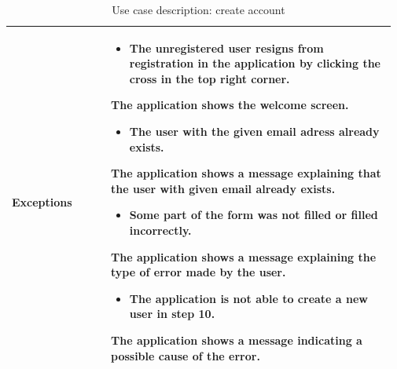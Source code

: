 \begin{table}[H]
\begin{tabular}{@{}p{0.25\linewidth} p{0.72\linewidth}@{}}
		\textbf{Exceptions}         & \begin{itemize}[leftmargin=.4cm,noitemsep,topsep=0pt,before=\vspace{-3mm}]
		   \item The unregistered user resigns from registration in the application by clicking the cross in the top right corner. 
		\end{itemize}
		The application shows the welcome screen.
		\begin{itemize}[leftmargin=.4cm,noitemsep,topsep=0pt]
		   \item The user with the given email adress already exists. 
		\end{itemize}
		The application shows a message explaining that the user with given email already exists.
		\begin{itemize}[leftmargin=.4cm,noitemsep,topsep=0pt]
		   \item Some part of the form was not filled or filled incorrectly.
		\end{itemize}
		The application shows a message explaining the type of error made by the user.
	    \begin{itemize}[leftmargin=.4cm,noitemsep,topsep=0pt]
		   \item The application is not able to create a new user in step 10.
		\end{itemize}
		The application shows a message indicating a possible cause of the error.
	    \\\bottomrule
	\end{tabular}
	\caption{Use case description: create account} 
\end{table}


